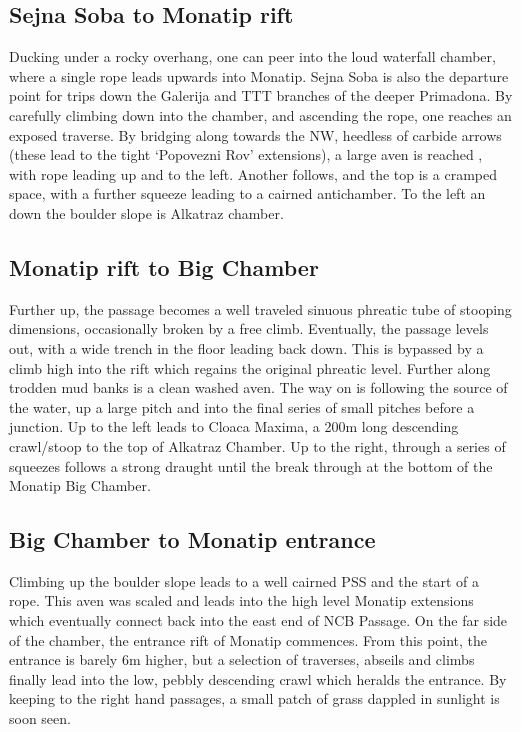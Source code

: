 \subsection{Sejna Soba to Monatip rift}
Ducking under a rocky overhang, one can peer into the loud waterfall chamber, where a single rope leads upwards into Monatip. Sejna Soba is also the departure point for trips down the Galerija and TTT branches of the deeper Primadona. By carefully climbing down into the chamber, and ascending the rope, one reaches an exposed traverse. By bridging along towards the NW, heedless of carbide arrows (these lead to the tight ‘Popovezni Rov’ extensions), a large aven is reached , with rope leading up and to the left. Another follows, and the top is a cramped space, with a further squeeze leading to a cairned antichamber. To the left an down the boulder slope is Alkatraz chamber.

\subsection{Monatip rift to Big Chamber}
Further up, the passage becomes a well traveled sinuous phreatic tube of stooping dimensions, occasionally broken by a free climb. Eventually, the passage levels out, with a wide trench in the floor leading back down. This is bypassed by a climb high into the rift which regains the original phreatic level. Further along trodden mud banks is a clean washed aven. The way on is following the source of the water, up a large pitch and into the final series of small pitches before a junction. Up to the left leads to Cloaca Maxima, a 200m long descending crawl/stoop to the top of Alkatraz Chamber.  Up to the right, through a series of squeezes follows a strong draught until the break through at the bottom of the Monatip Big Chamber.

\subsection{Big Chamber to Monatip entrance}
Climbing up the boulder slope leads to a well cairned PSS and the start of a rope. This aven was scaled and leads into the high level Monatip extensions which eventually connect back into the east end of NCB Passage.  On the far side of the chamber, the entrance rift of Monatip commences. From this point, the entrance is barely 6m higher, but a selection of traverses, abseils and climbs finally lead into the low, pebbly descending crawl which heralds the entrance. By keeping to the right hand passages, a small patch of grass dappled in sunlight is soon seen. 

